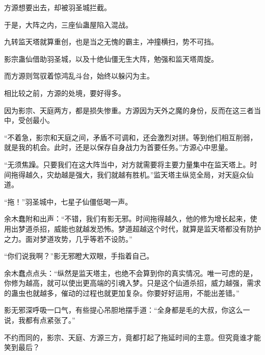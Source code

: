 \begin{this_body}
方源想要出去，却被羽圣城拦截。

于是，大阵之内，三座仙蛊屋陷入混战。

九转监天塔就算重创，也是当之无愧的霸主，冲撞横扫，势不可挡。

影宗蛊仙借助羽圣城，以及十绝仙僵无生大阵，勉强和监天塔周旋。

而方源则驾驭着惊鸿乱斗台，始终以躲闪为主。

相比较之前，方源的处境，要好得多。

因为影宗、天庭两方，都是损失惨重。方源因为天外之魔的身份，反而在这三者当中，受创最小。

“不着急，影宗和天庭之间，矛盾不可调和，还会激烈对拼。等到他们相互削弱，就是我的机会。此时，还是以保存自身战力为首要任务。”方源心中思量。

“无须焦躁。只要我们在这大阵当中，对方就需要将主要力量集中在监天塔上。时间拖得越久，灾劫越是强大，我们就越有胜机。”监天塔主纵览全局，对天庭众仙道。

“拖！”羽圣城中，七星子仙僵低喝一声。

余木蠢附和出声：“不错，我们有影无邪。时间拖得越久，他的修为增长起来，使用出梦道杀招，威能也就越发恐怖。梦道超越这个时代，就算是监天塔都没有防护之力。面对梦道攻势，几乎等若不设防。”

“你们说我啊？”影无邪瞪大双眼，手指着自己。

余木蠢点点头：“纵然是监天塔主，也绝不会算到你的真实情况。唯一可虑的是，你修为越高，就可以使出更高端的引魂入梦。只是这个仙道杀招，威力越强，需求的蛊虫也就越多，催动的过程也就更加复杂。你要好好运用，不能出差错。”

影无邪深呼吸一口气，有些提心吊胆地摆手道：“全身都是毛的大叔，你这么一说，我都有点紧张了。”

不约而同的，影宗、天庭、方源三方，竟都打起了拖延时间的主意。但究竟谁才能笑到最后？

\end{this_body}

